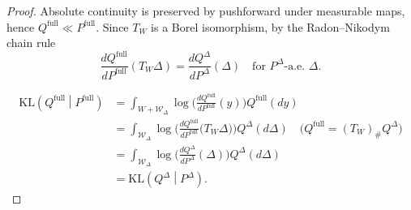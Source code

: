 \documentclass{article} %
\begin{document}
\begin{proof}
  Absolute continuity is preserved by pushforward under measurable maps, hence $Q^{\mathrm{full}}\ll P^{\mathrm{full}}$. Since $T_W$ is a Borel isomorphism, by the Radon–Nikodym chain rule
 \[
 \frac{dQ^{\mathrm{full}}}{dP^{\mathrm{full}}}(T_W\Delta)=\frac{dQ^{\Delta}}{dP^{\Delta}}(\Delta)\quad\text{for }P^{\Delta}\text{-a.e.\ }\Delta.
 \]

\begin{equation*}
     \begin{aligned}
 \mathrm{KL}\left(Q^{\mathrm{full}}\middle|P^{\mathrm{full}}\right)
 &= \int_{W+\mathcal W_\Delta}
 \log\Big(\frac{dQ^{\mathrm{full}}}{dP^{\mathrm{full}}}(y)\Big)
 Q^{\mathrm{full}}(dy)\\
 &= \int_{\mathcal W_\Delta}
 \log\Big(\frac{dQ^{\mathrm{full}}}{dP^{\mathrm{full}}}\big(T_W\Delta\big)\Big)
 Q^{\Delta}(d\Delta) \quad \text{(} Q^{\mathrm{full}}=(T_W)_{\text{\#}}Q^{\Delta}\text{)} 
 \\
 &= \int_{\mathcal W_\Delta}
 \log\Big(\frac{dQ^{\Delta}}{dP^{\Delta}}(\Delta)\Big)
 Q^{\Delta}(d\Delta) \\
 &= \mathrm{KL}\left(Q^{\Delta}\middle|P^{\Delta}\right).
 \end{aligned}
\end{equation*}
\end{proof}



\end{document}
